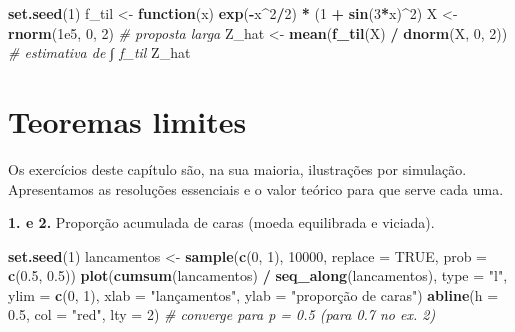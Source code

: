 \documentclass[
  portuguese,
  11pt,
  openany]{book}
\newenvironment{Shaded}{\begin{snugshade}}{\end{snugshade}}
\newcommand{\AttributeTok}[1]{\textcolor[rgb]{0.13,0.29,0.53}{#1}}
\newcommand{\CommentTok}[1]{\textcolor[rgb]{0.56,0.35,0.01}{\textit{#1}}}
\newcommand{\ConstantTok}[1]{\textcolor[rgb]{0.56,0.35,0.01}{#1}}
\newcommand{\ControlFlowTok}[1]{\textcolor[rgb]{0.13,0.29,0.53}{\textbf{#1}}}
\newcommand{\DecValTok}[1]{\textcolor[rgb]{0.00,0.00,0.81}{#1}}
\newcommand{\FloatTok}[1]{\textcolor[rgb]{0.00,0.00,0.81}{#1}}
\newcommand{\FunctionTok}[1]{\textcolor[rgb]{0.13,0.29,0.53}{\textbf{#1}}}
\newcommand{\NormalTok}[1]{#1}
\newcommand{\OtherTok}[1]{\textcolor[rgb]{0.56,0.35,0.01}{#1}}
\newcommand{\SpecialCharTok}[1]{\textcolor[rgb]{0.81,0.36,0.00}{\textbf{#1}}}
\newcommand{\StringTok}[1]{\textcolor[rgb]{0.31,0.60,0.02}{#1}}
\begin{document}
\begin{Shaded}
\begin{Highlighting}[]
\FunctionTok{set.seed}\NormalTok{(}\DecValTok{1}\NormalTok{)}
\NormalTok{f\_til }\OtherTok{\textless{}{-}} \ControlFlowTok{function}\NormalTok{(x) }\FunctionTok{exp}\NormalTok{(}\SpecialCharTok{{-}}\NormalTok{x}\SpecialCharTok{\^{}}\DecValTok{2}\SpecialCharTok{/}\DecValTok{2}\NormalTok{) }\SpecialCharTok{*}\NormalTok{ (}\DecValTok{1} \SpecialCharTok{+} \FunctionTok{sin}\NormalTok{(}\DecValTok{3}\SpecialCharTok{*}\NormalTok{x)}\SpecialCharTok{\^{}}\DecValTok{2}\NormalTok{)}
\NormalTok{X }\OtherTok{\textless{}{-}} \FunctionTok{rnorm}\NormalTok{(}\FloatTok{1e5}\NormalTok{, }\DecValTok{0}\NormalTok{, }\DecValTok{2}\NormalTok{)                       }\CommentTok{\# proposta larga}
\NormalTok{Z\_hat }\OtherTok{\textless{}{-}} \FunctionTok{mean}\NormalTok{(}\FunctionTok{f\_til}\NormalTok{(X) }\SpecialCharTok{/} \FunctionTok{dnorm}\NormalTok{(X, }\DecValTok{0}\NormalTok{, }\DecValTok{2}\NormalTok{))    }\CommentTok{\# estimativa de ∫ f\_til}
\NormalTok{Z\_hat}
\end{Highlighting}
\end{Shaded}

\section{Teoremas limites}\label{teoremas-limites-1}

Os exercícios deste capítulo são, na sua maioria, ilustrações por simulação.
Apresentamos as resoluções essenciais e o valor teórico para que serve cada uma.

\textbf{1. e 2.} Proporção acumulada de caras (moeda equilibrada e viciada).

\begin{Shaded}
\begin{Highlighting}[]
\FunctionTok{set.seed}\NormalTok{(}\DecValTok{1}\NormalTok{)}
\NormalTok{lancamentos }\OtherTok{\textless{}{-}} \FunctionTok{sample}\NormalTok{(}\FunctionTok{c}\NormalTok{(}\DecValTok{0}\NormalTok{, }\DecValTok{1}\NormalTok{), }\DecValTok{10000}\NormalTok{, }\AttributeTok{replace =} \ConstantTok{TRUE}\NormalTok{, }\AttributeTok{prob =} \FunctionTok{c}\NormalTok{(}\FloatTok{0.5}\NormalTok{, }\FloatTok{0.5}\NormalTok{))}
\FunctionTok{plot}\NormalTok{(}\FunctionTok{cumsum}\NormalTok{(lancamentos) }\SpecialCharTok{/} \FunctionTok{seq\_along}\NormalTok{(lancamentos), }\AttributeTok{type =} \StringTok{"l"}\NormalTok{,}
     \AttributeTok{ylim =} \FunctionTok{c}\NormalTok{(}\DecValTok{0}\NormalTok{, }\DecValTok{1}\NormalTok{), }\AttributeTok{xlab =} \StringTok{"lançamentos"}\NormalTok{, }\AttributeTok{ylab =} \StringTok{"proporção de caras"}\NormalTok{)}
\FunctionTok{abline}\NormalTok{(}\AttributeTok{h =} \FloatTok{0.5}\NormalTok{, }\AttributeTok{col =} \StringTok{"red"}\NormalTok{, }\AttributeTok{lty =} \DecValTok{2}\NormalTok{)   }\CommentTok{\# converge para p = 0.5 (para 0.7 no ex. 2)}
\end{Highlighting}
\end{Shaded}
\end{document}
